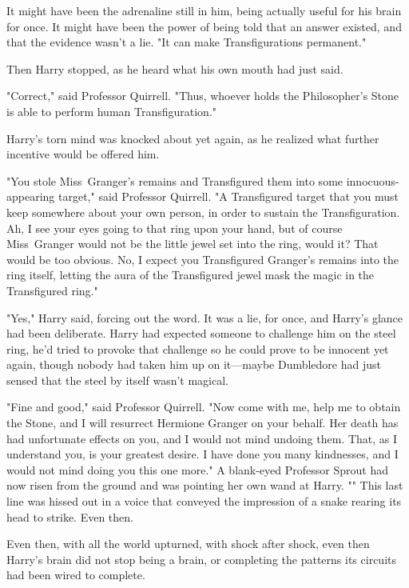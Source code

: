 It might have been the adrenaline still in him, being actually useful for his
brain for once. It might have been the power of being told that an answer
existed, and that the evidence wasn't a lie. "It can make Transfigurations
permanent."

Then Harry stopped, as he heard what his own mouth had just said.

"Correct," said Professor Quirrell. "Thus, whoever holds the Philosopher's
Stone is able to perform human Transfiguration."

Harry's torn mind was knocked about yet again, as he realized what further
incentive would be offered him.

"You stole Miss~Granger's remains and Transfigured them into some
innocuous-appearing target," said Professor Quirrell. "A Transfigured target
that you must keep somewhere about your own person, in order to sustain the
Transfiguration. Ah, I see your eyes going to that ring upon your hand, but of
course Miss~Granger would not be the little jewel set into the ring, would it?
That would be too obvious. No, I expect you Transfigured Granger's remains into
the ring itself, letting the aura of the Transfigured jewel mask the magic in
the Transfigured ring."

"Yes," Harry said, forcing out the word. It was a lie, for once, and Harry's
glance had been deliberate. Harry had expected someone to challenge him on the
steel ring, he'd tried to provoke that challenge so he could prove to be
innocent yet again, though nobody had taken him up on it---maybe Dumbledore had
just sensed that the steel by itself wasn't magical.

"Fine and good," said Professor Quirrell. "Now come with me, help me to obtain
the Stone, and I will resurrect Hermione Granger on your behalf. Her death has
had unfortunate effects on you, and I would not mind undoing them. That, as I
understand you, is your greatest desire. I have done you many kindnesses, and I
would not mind doing you this one more." A blank-eyed Professor Sprout had now
risen from the ground and was pointing her own wand at Harry. "" This last line was hissed out in a voice that conveyed the impression
of a snake rearing its head to strike.
\later
Even then.

Even then, with all the world upturned, with shock after shock, even then
Harry's brain did not stop being a brain, or completing the patterns its
circuits had been wired to complete.

